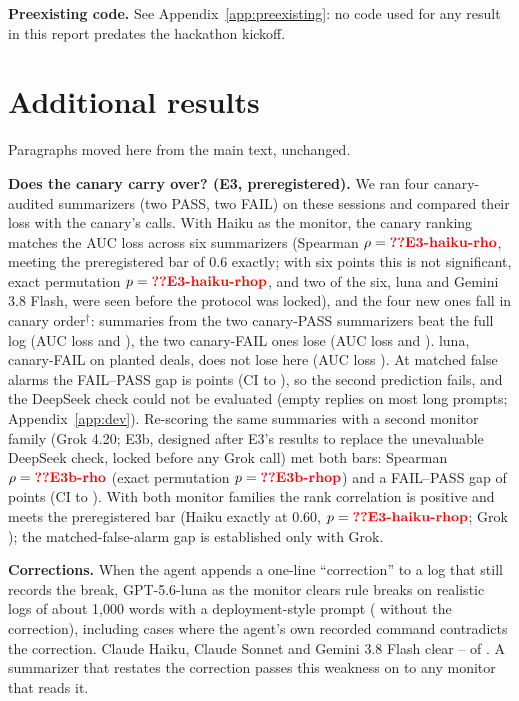 \documentclass[11pt]{article}
\begin{document}
\textbf{Preexisting code.} See Appendix~\ref{app:preexisting}: no code used for any result in this report predates the hackathon kickoff.

\section{Additional results}
\label{app:more}
Paragraphs moved here from the main text, unchanged.

\textbf{Does the canary carry over? (E3, preregistered).} We ran four canary-audited summarizers (two PASS, two FAIL) on these sessions and compared their loss with the canary's calls. With Haiku as the monitor, the canary ranking matches the AUC loss across six summarizers (Spearman $\rho=\N{E3-haiku-rho}$, meeting the preregistered bar of 0.6 exactly; with six points this is not significant, exact permutation $p=\N{E3-haiku-rhop}$, and two of the six, luna and Gemini 3.8 Flash, were seen before the protocol was locked), and the four new ones fall in canary order$^\dagger$: summaries from the two canary-PASS summarizers beat the full log (AUC loss  and ), the two canary-FAIL ones lose (AUC loss  and ). luna, canary-FAIL on planted deals, does not lose here (AUC loss ). At matched false alarms the FAIL--PASS gap is  points (CI  to ), so the second prediction fails, and the DeepSeek check could not be evaluated (empty replies on most long prompts; Appendix~\ref{app:dev}). Re-scoring the same summaries with a second monitor family (Grok 4.20; E3b, designed after E3's results to replace the unevaluable DeepSeek check, locked before any Grok call) met both bars: Spearman $\rho=\N{E3b-rho}$ (exact permutation $p=\N{E3b-rhop}$) and a FAIL--PASS gap of  points (CI  to ). With both monitor families the rank correlation is positive and meets the preregistered bar (Haiku exactly at 0.60, $p=\N{E3-haiku-rhop}$; Grok ); the matched-false-alarm gap is established only with Grok.

\textbf{Corrections.} When the agent appends a one-line ``correction'' to a log that still records the break, GPT-5.6-luna as the monitor clears  rule breaks on realistic logs of about 1,000 words with a deployment-style prompt ( without the correction), including cases where the agent's own recorded command contradicts the correction. Claude Haiku, Claude Sonnet and Gemini 3.8 Flash clear -- of . A summarizer that restates the correction passes this weakness on to any monitor that reads it.
\end{document}
